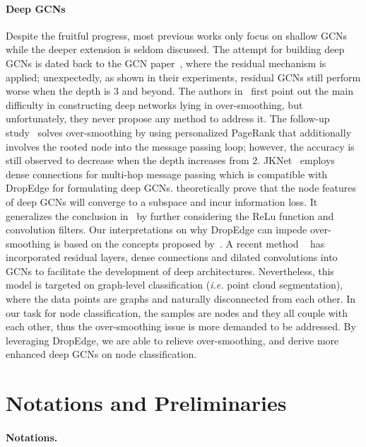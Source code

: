 \documentclass{article}
\begin{document}
\paragraph{Deep GCNs}
Despite the fruitful progress, most previous works only focus on shallow GCNs while the deeper extension is seldom discussed. The attempt for building deep GCNs is dated back to the  GCN paper~\citep{Kipf2017}, where the residual mechanism is applied; unexpectedly, as shown in their experiments, residual GCNs still perform worse when the depth is 3 and beyond.
The authors in~\citet{Li2018} first point out the main difficulty in constructing deep networks lying in over-smoothing, but unfortunately, they never propose any method to address it. The follow-up study~\citep{Klicpera2019} solves over-smoothing by using personalized PageRank that additionally involves the rooted node into the message passing loop; however, the accuracy is still observed to decrease when the depth increases from 2.
JKNet~\citep{Xu2018} employs dense connections for multi-hop message passing which is compatible with DropEdge for formulating deep GCNs. \citet{oono2019asymptotic} theoretically prove that the node features of deep GCNs will converge to a subspace and incur information loss. It generalizes the conclusion in~\citet{Li2018} by further considering the ReLu function and convolution filters. Our interpretations on why DropEdge can impede over-smoothing is based on the concepts proposed by~\citet{oono2019asymptotic}. A recent method ~\citep{li2019can} has incorporated residual layers, dense connections and dilated convolutions into GCNs to facilitate the development of deep architectures. Nevertheless, this model is targeted on graph-level classification (\emph{i.e.} point cloud segmentation), where the data points are graphs and naturally disconnected from each other. In our task for node classification, the samples are nodes and they all couple with each other, thus the over-smoothing issue is more demanded to be addressed. By leveraging DropEdge, we are able to relieve over-smoothing, and derive more enhanced deep GCNs on node classification.


\section{Notations and Preliminaries}

\paragraph{Notations.}
\end{document}
